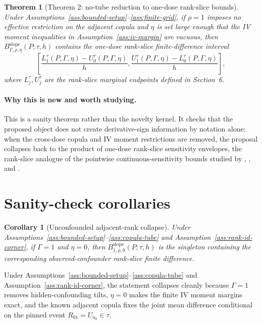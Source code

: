 \documentclass[11pt]{article}
\theoremstyle{definition}
\theoremstyle{plain}
\newtheorem{theorem}{Theorem}
\newtheorem{corollary}{Corollary}
\theoremstyle{remark}
\begin{document}
\begin{theorem}[Theorem 2: no-tube reduction to one-dose rank-slice bounds]\label{thm:no-tube-reduction}
Under Assumptions~\ref{ass:bounded-setup}--\ref{ass:finite-grid}, if \(\rho=1\) imposes no effective restriction on the adjacent copula and \(\eta\) is set large enough that the IV moment inequalities in Assumption~\ref{ass:iv-margin} are vacuous, then \(B_{\Gamma,\rho,\eta}^{\mathrm{slope}}(P;\tau,h)\) contains the one-dose rank-slice finite-difference interval
\[
\left[\frac{L_1^\tau(P,\Gamma,\eta)-U_0^\tau(P,\Gamma,\eta)}{h},
\frac{U_1^\tau(P,\Gamma,\eta)-L_0^\tau(P,\Gamma,\eta)}{h}\right],
\]
where \(L_j^\tau,U_j^\tau\) are the rank-slice marginal endpoints defined in Section~6.
\end{theorem}

\paragraph{Why this is new and worth studying.}
This is a sanity theorem rather than the novelty kernel.  It checks that the proposed object does not create derivative-sign information by notation alone: when the cross-dose copula and IV moment restrictions are removed, the proposal collapses back to the product of one-dose rank-slice sensitivity envelopes, the rank-slice analogue of the pointwise continuous-sensitivity bounds studied by \citet{JessonDouglasManshausenSolalMeinshausenStierGalShalit2022}, \citet{MarmarelisHaddadJessonJahanshadGalstyanVerSteeg2023}, and \citet{BaitairianSebastienJreichKatsahianGuilloux2025}.

\section{Sanity-check corollaries}
\begin{corollary}[Unconfounded adjacent-rank collapse]\label{cor:gamma-one-collapse}
Under Assumptions~\ref{ass:bounded-setup}--\ref{ass:copula-tube} and Assumption~\ref{ass:rank-id-corner}, if \(\Gamma=1\) and \(\eta=0\), then \(B_{1,\rho,0}^{\mathrm{slope}}(P;\tau,h)\) is the singleton containing the corresponding observed-confounder rank-slice finite difference.
\end{corollary}

Under Assumptions~\ref{ass:bounded-setup}--\ref{ass:copula-tube} and Assumption~\ref{ass:rank-id-corner}, the statement collapses cleanly because \(\Gamma=1\) removes hidden-confounding tilts, \(\eta=0\) makes the finite IV moment margins exact, and the known adjacent copula fixes the joint mean difference conditional on the pinned event \(R_{01}=U_{a_0}\in\tau\).
\end{document}
